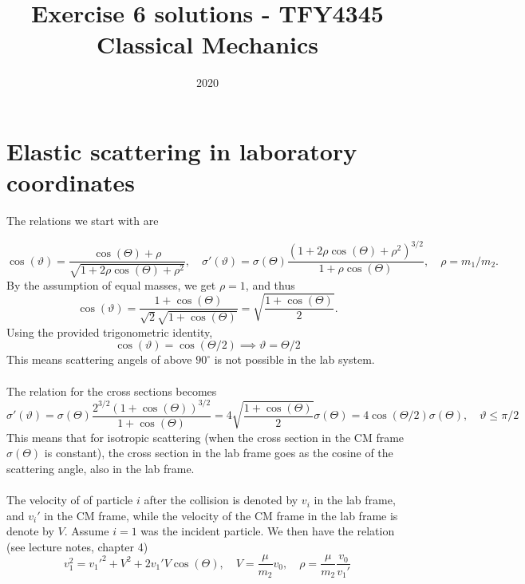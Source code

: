 \documentclass{article}
\title{Exercise 6 solutions - TFY4345 Classical Mechanics}
\date{2020}
\begin{document}
    \maketitle

    \section{Elastic scattering in laboratory coordinates}
    The relations we start with are

    \begin{equation*}
        \cos(\vartheta) = \frac{\cos(\Theta) + \rho}{\sqrt{1 + 2\rho \cos(\Theta) + \rho^2}}, \quad \sigma'(\vartheta) = \sigma (\Theta) \frac{(1 + 2\rho \cos(\Theta) + \rho^2)^{3/2}}{1 + \rho \cos(\Theta)}, \quad \rho = m_1 / m_2.
    \end{equation*}
    By the assumption of equal masses, we get $\rho = 1$, and thus
    \begin{equation*}
        \cos(\vartheta) = \frac{1 + \cos(\Theta)}{\sqrt 2 \sqrt{1 + \cos(\Theta)}} = \sqrt{\frac{1 + \cos(\Theta)}{2}}.
    \end{equation*}
    Using the provided trigonometric identity, 
    \begin{equation*}
        \cos(\vartheta) = \cos(\Theta / 2) \implies \vartheta = \Theta/2
    \end{equation*}
    This means scattering angels of above $90^\circ$ is not possible in the lab system.
    \\
    \\
The relation for the cross sections becomes
\begin{equation*}
    \sigma'(\vartheta) = \sigma(\Theta) \frac{2^{3/2}(1 + \cos(\Theta))^{3/2}}{1 + \cos(\Theta)} = 4 \sqrt{\frac{ 1 + \cos(\Theta)}{2}} \sigma(\Theta) = 4 \cos(\Theta/2) \sigma(\Theta), \quad \vartheta \leq \pi/2
\end{equation*}
This means that for isotropic scattering (when the cross section in the CM frame $\sigma(\Theta)$ is constant), the cross section in the lab frame goes as the cosine of the scattering angle, also in the lab frame.
\\
\\
The velocity of of particle $i$ after the collision is denoted by $v_i$ in the lab frame, and $v_i'$ in the CM frame, while the velocity of the CM frame in the lab frame is denote by $V$. Assume $i=1$ was the incident particle. We then have the relation (see lecture notes, chapter 4)
\begin{equation*}
    v_1^2 = v_1'^2 + V^2 + 2v_1'V \cos(\Theta), \quad V = \frac{\mu}{m_2} v_0, \quad \rho = \frac{\mu}{m_2}\frac{v_0}{v_1'}
\end{equation*}
\end{document}
